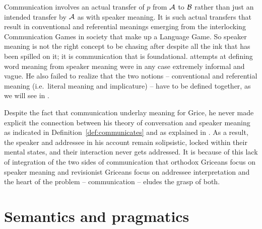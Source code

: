 Communication involves an actual transfer of $p$ from $\cal A$ to $\cal B$ rather than just an intended transfer by $\cal A$ as with speaker meaning. It is such actual transfers that result in conventional and referential meanings emerging from the interlocking Communication Games in society that make up a Language Game. So speaker meaning is not the right concept to be chasing after despite all the ink that has been spilled on it; it is communication that is foundational.  attempts at defining word meaning from speaker meaning were in any case extremely informal and vague. He also failed to realize that the two notions -- conventional and referential meaning (i.e.\ literal meaning and implicature) -- have to be defined together, as we will see in .

Despite the fact that communication underlay meaning for Grice, he never made explicit the connection between his theory of conversation and speaker meaning as indicated in Definition~\ref{def:communicates} and as explained in . As a result, the speaker and addressee in his account remain solipsistic, locked within their mental states, and their interaction never gets addressed. It is because of this lack of integration of the two sides of communication that orthodox Griceans focus on speaker meaning and revisionist Griceans focus on addressee interpretation and the heart of the problem -- communication -- eludes the grasp of both.



\section{Semantics and pragmatics} \label{sec:semantics and pragmatics}

